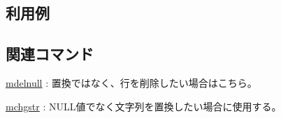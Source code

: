 \subsection*{利用例}

\subsection*{関連コマンド}
\hyperref[sect:mdelnull]{mdelnull} : 置換ではなく、行を削除したい場合はこちら。

\hyperref[sect:mchgstr]{mchgstr} : NULL値でなく文字列を置換したい場合に使用する。

%
